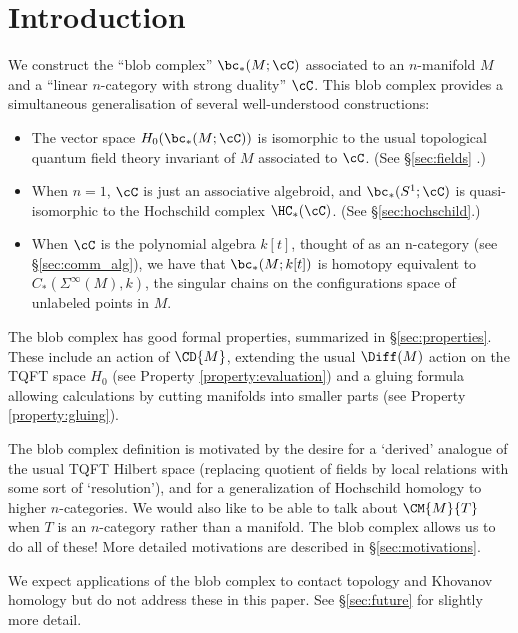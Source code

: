 
\section{Introduction}

We construct the ``blob complex'' $\bc_*(M; \cC)$ associated to an $n$-manifold $M$ and a ``linear $n$-category with strong duality'' $\cC$. This blob complex provides a simultaneous generalisation of several well-understood constructions:
\begin{itemize}
\item The vector space $H_0(\bc_*(M; \cC))$ is isomorphic to the usual topological quantum field theory invariant of $M$ associated to $\cC$. (See \S \ref{sec:fields} .)
\item When $n=1$, $\cC$ is just an associative algebroid, and $\bc_*(S^1; \cC)$ is quasi-isomorphic to the Hochschild complex $\HC_*(\cC)$. (See \S \ref{sec:hochschild}.)
\item When $\cC$ is the polynomial algebra $k[t]$, thought of as an n-category (see \S \ref{sec:comm_alg}), we have 
that $\bc_*(M; k[t])$ is homotopy equivalent to $C_*(\Sigma^\infty(M), k)$, the singular chains
on the configurations space of unlabeled points in $M$.
\end{itemize}
The blob complex has good formal properties, summarized in \S \ref{sec:properties}. These include an action of $\CD{M}$, 
extending the usual $\Diff(M)$ action on the TQFT space $H_0$ (see Property \ref{property:evaluation}) and a gluing formula allowing calculations by cutting manifolds into smaller parts (see Property \ref{property:gluing}).

The blob complex definition is motivated by the desire for a `derived' analogue of the usual TQFT Hilbert space (replacing quotient of fields by local relations with some sort of `resolution'), 
and for a generalization of Hochschild homology to higher $n$-categories. We would also like to be able to talk about $\CM{M}{T}$ when $T$ is an $n$-category rather than a manifold. The blob complex allows us to do all of these! More detailed motivations are described in \S \ref{sec:motivations}.

We expect applications of the blob complex to contact topology and Khovanov homology but do not address these in this paper. See \S \ref{sec:future} for slightly more detail.

